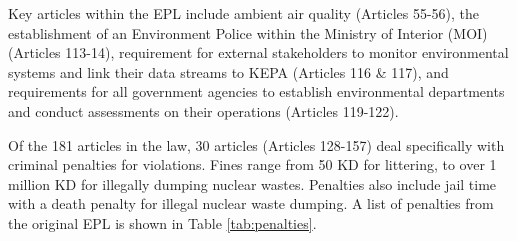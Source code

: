 \begin{table}[H]
\centering
\caption{Summary of EPL structure.}
\label{tab:EPL}
\end{table}

Key articles within the EPL include ambient air quality (Articles 55-56), the establishment of an Environment Police within the Ministry of Interior (MOI) (Articles 113-14), requirement for external stakeholders to monitor environmental systems and link their data streams to KEPA (Articles 116 \& 117), and requirements for all government agencies to establish environmental departments and conduct assessments on their operations (Articles 119-122).

Of the 181 articles in the law, 30 articles (Articles 128-157) deal specifically with criminal penalties for violations. Fines range from 50 KD for littering, to over 1 million KD for illegally dumping nuclear wastes. Penalties also include jail time with a death penalty for illegal nuclear waste dumping. A list of penalties from the original EPL is shown in Table \ref{tab:penalties}.


